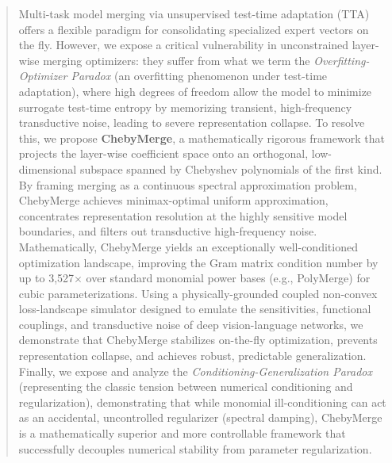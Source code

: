 \begin{abstract}
Multi-task model merging via unsupervised test-time adaptation (TTA) offers a flexible paradigm for consolidating specialized expert vectors on the fly. However, we expose a critical vulnerability in unconstrained layer-wise merging optimizers: they suffer from what we term the \emph{Overfitting-Optimizer Paradox} (an overfitting phenomenon under test-time adaptation), where high degrees of freedom allow the model to minimize surrogate test-time entropy by memorizing transient, high-frequency transductive noise, leading to severe representation collapse. To resolve this, we propose \textbf{ChebyMerge}, a mathematically rigorous framework that projects the layer-wise coefficient space onto an orthogonal, low-dimensional subspace spanned by Chebyshev polynomials of the first kind. By framing merging as a continuous spectral approximation problem, ChebyMerge achieves minimax-optimal uniform approximation, concentrates representation resolution at the highly sensitive model boundaries, and filters out transductive high-frequency noise. Mathematically, ChebyMerge yields an exceptionally well-conditioned optimization landscape, improving the Gram matrix condition number by up to 3,527$\times$ over standard monomial power bases (e.g., PolyMerge) for cubic parameterizations. Using a physically-grounded coupled non-convex loss-landscape simulator designed to emulate the sensitivities, functional couplings, and transductive noise of deep vision-language networks, we demonstrate that ChebyMerge stabilizes on-the-fly optimization, prevents representation collapse, and achieves robust, predictable generalization. Finally, we expose and analyze the \emph{Conditioning-Generalization Paradox} (representing the classic tension between numerical conditioning and regularization), demonstrating that while monomial ill-conditioning can act as an accidental, uncontrolled regularizer (spectral damping), ChebyMerge is a mathematically superior and more controllable framework that successfully decouples numerical stability from parameter regularization.
\end{abstract}
